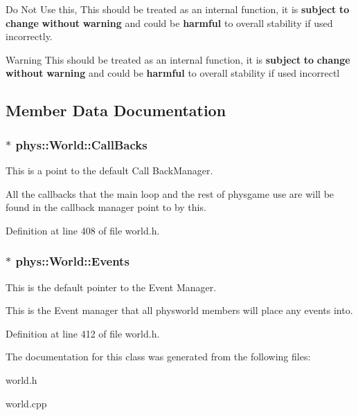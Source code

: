 Do Not Use this, This should be treated as an internal function, it is {\bfseries subject} {\bfseries to} {\bfseries change} {\bfseries without} {\bfseries warning} and could be {\bfseries harmful} to overall stability if used incorrectly. 

\begin{DoxyWarning}{Warning}
This should be treated as an internal function, it is {\bfseries subject} {\bfseries to} {\bfseries change} {\bfseries without} {\bfseries warning} and could be {\bfseries harmful} to overall stability if used incorrectl 
\end{DoxyWarning}


\subsection{Member Data Documentation}
\hypertarget{classphys_1_1World_a22a1624c63198f49fdf8e448881bdb2e}{
\subsubsection[{CallBacks}]{$\ast$ {\bf phys::World::CallBacks}}}
\label{da/ddf/classphys_1_1World_a22a1624c63198f49fdf8e448881bdb2e}


This is a point to the default Call BackManager. 

All the callbacks that the main loop and the rest of physgame use are will be found in the callback manager point to by this. 

Definition at line 408 of file world.h.

\hypertarget{classphys_1_1World_ad0b13f1f3caf0342f56671b522543453}{
\subsubsection[{Events}]{$\ast$ {\bf phys::World::Events}}}
\label{da/ddf/classphys_1_1World_ad0b13f1f3caf0342f56671b522543453}


This is the default pointer to the Event Manager. 

This is the Event manager that all physworld members will place any events into. 

Definition at line 412 of file world.h.



The documentation for this class was generated from the following files:\begin{DoxyCompactItemize}
\item 
world.h\item 
world.cpp\end{DoxyCompactItemize}
